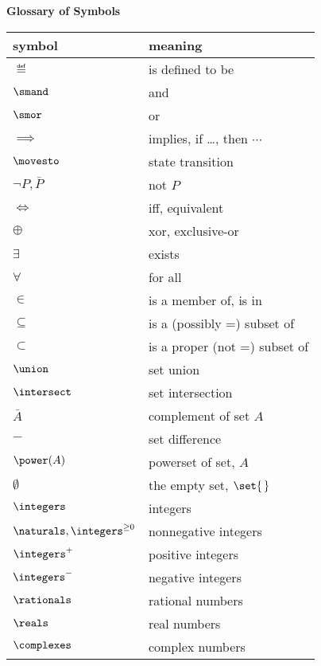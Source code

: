 
\begin{center}
\large \textbf{Glossary of Symbols}
\end{center}

\begin{center}
\begin{tabular}{ll}
symbol         &  meaning\\
\hline
$\eqdef$       & is defined to be\\
$\smand$       & and\\
$\smor$        & or\\
$\implies$     & implies, if \dots, then $\cdots$\\
$\movesto$     & state transition\\
$\neg P, \bar{P}$      & not $P$\\
$\iff$         & iff, equivalent\\
$\oplus$       & xor, exclusive-or\\
$\exists$      & exists\\
$\forall$      & for all\\
$\in$          & is a member of, is in\\
$\subseteq$    & is a (possibly =) subset of\\
$\subset$      & is a proper (not =) subset of\\
$\union$       & set union\\
$\intersect$   & set intersection\\
$\bar{A}$      & complement of set $A$\\
$-$            & set difference\\
$\power(A)$    & powerset of set, $A$\\
$\emptyset$    & the empty set, $\set{\,}$\\
$\integers$    & integers\\
$\naturals, \integers^{\ge 0}$    & nonnegative integers \\
$\integers^{+}$ & positive integers\\
$\integers^{-}$ & negative integers\\
$\rationals$   & rational numbers\\
$\reals$       & real numbers\\
$\complexes$   & complex numbers\\

\end{tabular}
\end{center}
